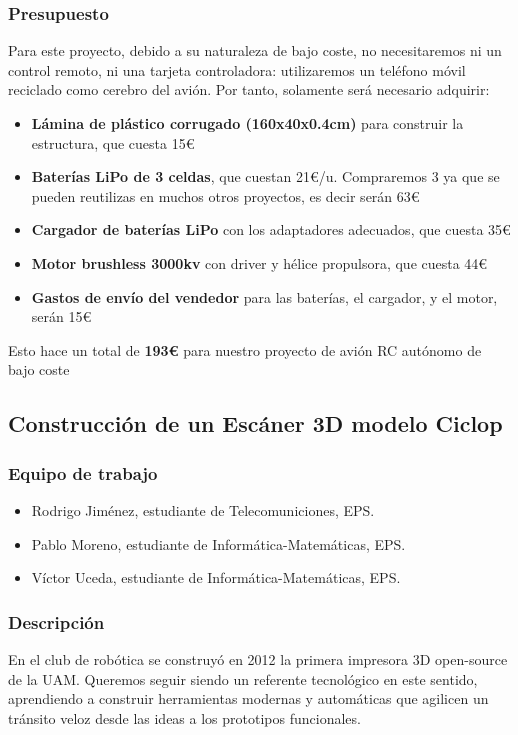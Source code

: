 \documentclass[12pt,twoside]{report}
\begin{document}
\subsubsection{Presupuesto}

Para este proyecto, debido a su naturaleza de bajo coste, no necesitaremos ni un control remoto, ni una tarjeta controladora: utilizaremos un teléfono móvil reciclado como cerebro del avión. Por tanto, solamente será necesario adquirir:

\begin{itemize}
\item \textbf{Lámina de plástico corrugado (160x40x0.4cm)} para construir la estructura, que cuesta 15\euro{}
\item \textbf{Baterías LiPo de 3 celdas}, que cuestan 21\euro{}/u. Compraremos 3 ya que se pueden reutilizas en muchos otros proyectos, es decir serán 63\euro{}
\item \textbf{Cargador de baterías LiPo} con los adaptadores adecuados, que cuesta 35\euro{}
\item \textbf{Motor brushless 3000kv} con driver y hélice propulsora, que cuesta 44\euro{}
\item \textbf{Gastos de envío del vendedor} para las baterías, el cargador, y el motor, serán 15\euro{}
\end{itemize}

Esto hace un total de {\bf 193\euro{}} para nuestro proyecto de avión RC autónomo de bajo coste




\subsection{Construcción de un Escáner 3D modelo Ciclop}

\subsubsection{Equipo de trabajo}
\begin{itemize}
\item Rodrigo Jiménez, estudiante de Telecomuniciones, EPS.
\item Pablo Moreno, estudiante de Informática-Matemáticas, EPS.
\item Víctor Uceda, estudiante de Informática-Matemáticas, EPS.
\end{itemize}
\subsubsection{Descripción}
 En el club de robótica se construyó en 2012 la primera impresora 3D open-source de la UAM. Queremos seguir siendo un referente tecnológico en este sentido, aprendiendo a construir herramientas modernas y automáticas que agilicen un tránsito veloz desde las ideas a los prototipos funcionales.
\end{document}
